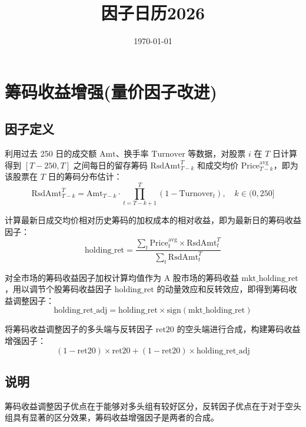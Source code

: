 \documentclass{article}
\title{因子日历2026}
\date{\today}
\begin{document}
\maketitle

\section{筹码收益增强(量价因子改进)}

\subsection{因子定义}
利用过去 250 日的成交额 \( \mathrm{Amt} \)、换手率 \( \mathrm{Turnover} \) 等数据，对股票 \( i \) 在 \( T \) 日计算得到 \([T-250, T]\) 之间每日的留存筹码 \( \mathrm{RsdAmt}_{T-k}^T \) 和成交均价 \( \mathrm{Price}_{T-k}^{\mathrm{avg}} \)，即为该股票在 \( T \) 日的筹码分布估计：
\begin{equation}
    \mathrm{RsdAmt}_{T-k}^T = \mathrm{Amt}_{T-k} \cdot \prod_{t=T-k+1}^{T} (1 - \mathrm{Turnover}_t), \quad k \in (0, 250]
\end{equation}

计算最新日成交均价相对历史筹码的加权成本的相对收益，即为最新日的筹码收益因子：
\begin{equation}
    \mathrm{holding\_ret} = \frac{\sum_t \mathrm{Price}_t^{\mathrm{avg}} \times \mathrm{RsdAmt}_t^T}{\sum_t \mathrm{RsdAmt}_t^T}
\end{equation}

对全市场的筹码收益因子加权计算均值作为 A 股市场的筹码收益 \( \mathrm{mkt\_holding\_ret} \)，用以调节个股筹码收益因子 \( \mathrm{holding\_ret} \) 的动量效应和反转效应，即得到筹码收益调整因子：
\begin{equation}
    \mathrm{holding\_ret\_adj} = \mathrm{holding\_ret} \times \mathrm{sign}(\mathrm{mkt\_holding\_ret})
\end{equation}

将筹码收益调整因子的多头端与反转因子 \( \mathrm{ret20} \) 的空头端进行合成，构建筹码收益增强因子：
\begin{equation}
     (1 - \mathrm{ret20}) \times \mathrm{ret20} + (1 - \mathrm{ret20}) \times \mathrm{holding\_ret\_adj}
\end{equation}

\subsection{说明}
筹码收益调整因子优点在于能够对多头组有较好区分，反转因子优点在于对于空头组具有显著的区分效果，筹码收益增强因子是两者的合成。
\end{document}
